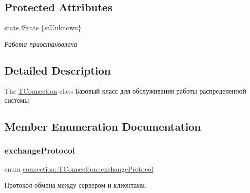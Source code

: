 \subsection*{Protected Attributes}
\begin{DoxyCompactItemize}
\item 
\mbox{\label{classconnection_1_1_t_connection_aa55714bb2a9a2b9330b2fd81f7a47f17}} 
\hyperlink{classconnection_1_1_t_connection_aee7dfb7510592bd2697ab6f906b9612c}{state} \hyperlink{classconnection_1_1_t_connection_aa55714bb2a9a2b9330b2fd81f7a47f17}{f\+State} \{st\+Unknown\}
\begin{DoxyCompactList}\small\item\em Работа приостановлена \end{DoxyCompactList}\end{DoxyCompactItemize}


\subsection{Detailed Description}
The \hyperlink{classconnection_1_1_t_connection}{T\+Connection} class Базовый класс для обслуживания работы распределенной системы 

\subsection{Member Enumeration Documentation}
\mbox{\label{classconnection_1_1_t_connection_a3550181cb2fa72eccfa55d23f45cea34}} 
\subsubsection{\texorpdfstring{exchange\+Protocol}{exchangeProtocol}}
{\footnotesize\ttfamily enum \hyperlink{classconnection_1_1_t_connection_a3550181cb2fa72eccfa55d23f45cea34}{connection\+::\+T\+Connection\+::exchange\+Protocol}}



Протокол обмена между сервером и клиентами. 

